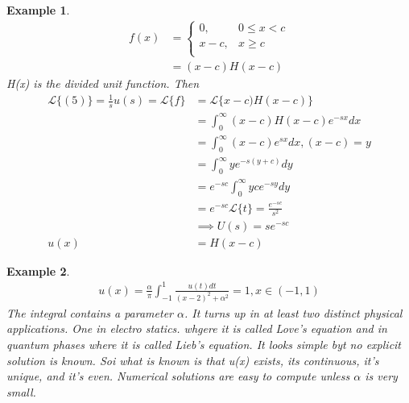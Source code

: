 \documentclass[10pt, oneside]{article}
\newtheorem{example}{Example}
\begin{document}
\begin{example}
    \begin{align*}
    f(x) &= \begin{cases} 0, & 0 \leq x < c \\
        x-c, & x \geq c \\
    \end{cases} \\
    & = (x-c)H(x-c)
    \end{align*}
    H(x) is the divided unit function. Then 
    \begin{align*}
        \mathscr{L} \{ (5) \} = \frac{1}{s} u(s) = \mathscr{L}\{ f\} & = \mathscr{L}\{ x-c)H(x-c)\} \\
        & = \int_{0}^{\infty} (x-c)H(x-c) e^{-sx}dx\\
        & = \int_{0}^{\infty} (x-c)e^{sx} dx, (x-c) = y\\
        & = \int_{0} ^{\infty} ye^{ -s(y+c)}dy \\
        & = e^{-sc}\int_{0} ^{\infty} yce^{-sy}dy\\
        & = e^{- sc}\mathscr{L} \{ t\} = \frac{e^{-sc}}{s^{2}} \\
        & \implies U(s) =se^{-sc} \\
        u(x) &= H(x-c)  
    \end{align*}

\end{example}
\begin{example}
    \begin{align*}
        u(x) = \frac{\alpha}{\pi} \int_{-1}^{1} \frac{u(t)dt}{(x-2)^{2}+\alpha^{2}} =1, x\in (-1,1)
    \end{align*}
    The integral contains a parameter $\alpha$. It turns up in at least two distinct physical applications. One in electro statics. whgere it is called Love's equation and in quantum phases where it is called Lieb's equation. It looks simple byt no explicit solution is known. Soi what is known is that u(x) exists, its continuous, it's unique, and it's even. Numerical solutions are easy to compute unless $\alpha$ is very small.  
\end{example}
\end{document}
